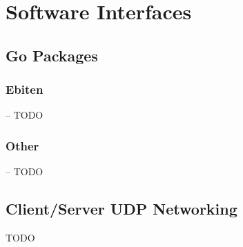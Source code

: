 \section{Software Interfaces} \label{sec:software_interfaces}


\subsection{Go Packages}
\subsubsection{Ebiten} -- TODO
\subsubsection{Other} -- TODO

\subsection{Client/Server UDP Networking}
TODO
